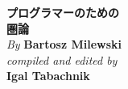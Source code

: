 

\thispagestyle{empty}

\vspace*{80pt}

\begin{raggedleft}
  \fontsize{24pt}{24pt}\selectfont
  \textbf{プログラマーのための \\ 圏論}\\
  \ifdefined{}
  \fi
  \vspace*{1cm}
  \fontsize{16pt}{18pt}\selectfont \textit{By } \textbf{Bartosz Milewski}\\
  \vspace{1cm}
  \fontsize{12pt}{14pt}\selectfont \textit{compiled and edited by}\\ \textbf{Igal Tabachnik}\\

\end{raggedleft}


\newpage

\vspace*{0.3\textheight}
\thispagestyle{empty}

